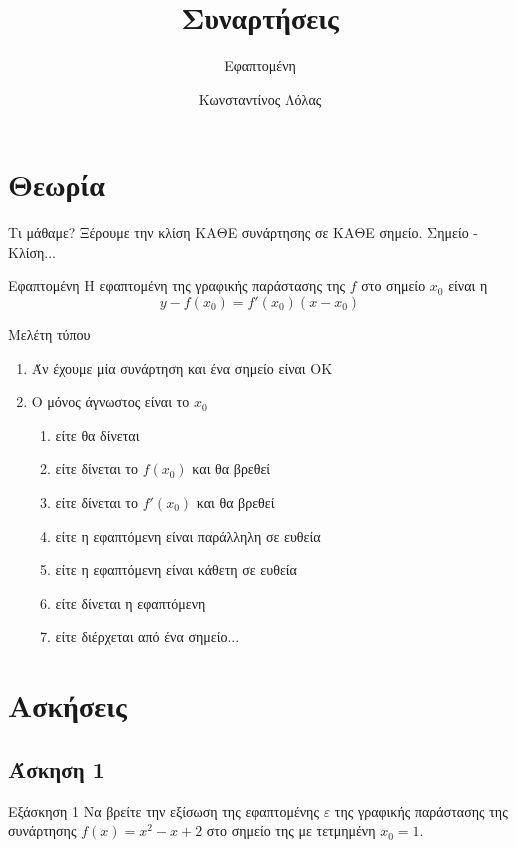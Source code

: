 \documentclass[greek]{beamer}
\title{Συναρτήσεις}
\subtitle{Εφαπτομένη}
\author[Λόλας]{Κωνσταντίνος Λόλας}
\date{}
\begin{document}
\begin{frame}
 \titlepage
\end{frame}

\section{Θεωρία}
\begin{frame}{Τι μάθαμε?}
 Ξέρουμε την κλίση ΚΑΘΕ συνάρτησης σε ΚΑΘΕ σημείο. \pause Σημείο - Κλίση...
 \begin{block}{Εφαπτομένη}
  Η εφαπτομένη της γραφικής παράστασης της $f$ στο σημείο $x_0$ είναι η
  $$y-f(x_0)=f'(x_0)(x-x_0)$$
 \end{block}
\end{frame}

\begin{frame}{Μελέτη τύπου}
 \begin{enumerate}
  \item<1-> Άν έχουμε μία συνάρτηση και ένα σημείο είναι ΟΚ
  \item<2-> Ο μόνος άγνωστος είναι το $x_0$
   \begin{enumerate}
    \item<3-> είτε θα δίνεται
    \item<4-> είτε δίνεται το $f(x_0)$ και θα βρεθεί
    \item<5-> είτε δίνεται το $f'(x_0)$ και θα βρεθεί
    \item<6-> είτε η εφαπτόμενη είναι παράλληλη σε ευθεία
    \item<7-> είτε η εφαπτόμενη είναι κάθετη σε ευθεία
    \item<8-> είτε δίνεται η εφαπτόμενη
    \item<9-> είτε διέρχεται από ένα σημείο...

   \end{enumerate}
 \end{enumerate}
\end{frame}

\section{Ασκήσεις}
\subsection{Άσκηση 1}
\begin{frame}[label=Άσκηση1]{Εξάσκηση 1}
 Να βρείτε την εξίσωση της εφαπτομένης $ε$ της γραφικής παράστασης της συνάρτησης $f(x)=x^2-x+2$ στο σημείο της με τετμημένη $x_0=1$.

\end{frame}
\end{document}
